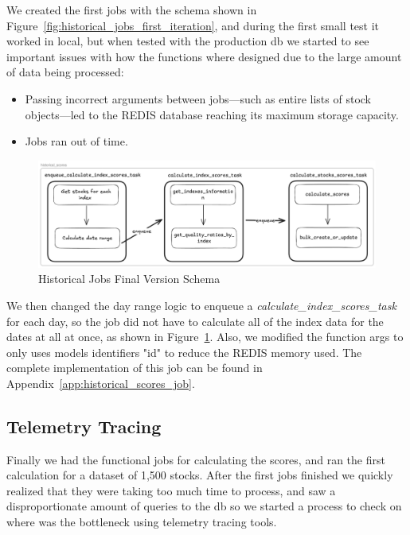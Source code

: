 \documentclass[11pt,english,a4paper,hidelinks]{book}
\begin{document}
\noindent We created the first jobs with the schema shown in Figure~\ref{fig:historical_jobs_first_iteration}, and during the first small test it worked in local, but when tested with the production \acrshort{db} we started to see important issues with how the functions where designed due to the large amount of data being processed:
\begin{itemize}
    \item Passing incorrect arguments between jobs—such as entire lists of stock objects—led to the REDIS database reaching its maximum storage capacity.
    \item Jobs ran out of time.
\end{itemize}

\begin{figure}[H]
    \centering
    \includegraphics[width=1\textwidth]{images/tweenvest/Historical Jobs Final Version.png}
    \caption{Historical Jobs Final Version Schema}
    \label{fig:historical_jobs_final_version}
\end{figure}

\noindent We then changed the day range logic to enqueue a \textit{calculate\_index\_scores\_task} for each day, so the job did not have to calculate all of the index data for the dates at all at once, as shown in Figure~\ref{fig:historical_jobs_final_version}. Also, we modified the function args to only uses models identifiers "id" to reduce the REDIS memory used. The complete implementation of this job can be found in Appendix~\ref{app:historical_scores_job}.

\subsection{Telemetry Tracing}
Finally we had the functional jobs for calculating the scores, and ran the first calculation for a dataset of 1,500 stocks. After the first jobs finished we quickly realized that they were taking too much time to process, and saw a disproportionate amount of queries to the \acrshort{db} so we started a process to check on where was the bottleneck using telemetry tracing tools.
\end{document}
